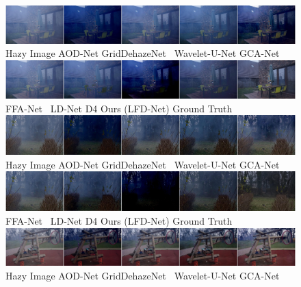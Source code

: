 \documentclass[lettersize,journal]{IEEEtran}
\begin{document}
\begin{figure}[ph!t]
    \centering
    \includegraphics[width=16.5cm]{ohaze_0_1.jpg} \\
    Hazy Image\qquad\quad\;\; AOD-Net\cite{li2017aod} \qquad GridDehazeNet\cite{liu2019griddehazenet} \;\, Wavelet-U-Net\cite{yang2019wavelet} \qquad GCA-Net\cite{chen2019gated}\\
    
    \includegraphics[width=16.5cm]{ohaze_0_2.jpg} \\ 
    FFA-Net\cite{qin2020ffa} \qquad\quad\, LD-Net\cite{ullah2021light} \qquad\qquad\;\; D4\cite{yang2022d4} \qquad\qquad\; Ours (LFD-Net) \qquad\quad Ground Truth \\
    
    \includegraphics[width=16.5cm]{ohaze_1_1.jpg} \\ 
    Hazy Image\qquad\quad\;\; AOD-Net\cite{li2017aod} \qquad GridDehazeNet\cite{liu2019griddehazenet} \;\, Wavelet-U-Net\cite{yang2019wavelet} \qquad GCA-Net\cite{chen2019gated}\\
    
    \includegraphics[width=16.5cm]{ohaze_1_2.jpg} \\ 
    FFA-Net\cite{qin2020ffa} \qquad\quad\, LD-Net\cite{ullah2021light} \qquad\qquad\;\; D4\cite{yang2022d4} \qquad\qquad\; Ours (LFD-Net) \qquad\quad Ground Truth \\
    
    \includegraphics[width=16.5cm]{ohaze_2_1.jpg} \\
    Hazy Image\qquad\quad\;\; AOD-Net\cite{li2017aod} \qquad GridDehazeNet\cite{liu2019griddehazenet} \;\, Wavelet-U-Net\cite{yang2019wavelet} \qquad GCA-Net\cite{chen2019gated}\\
    

\end{figure}
\end{document}
